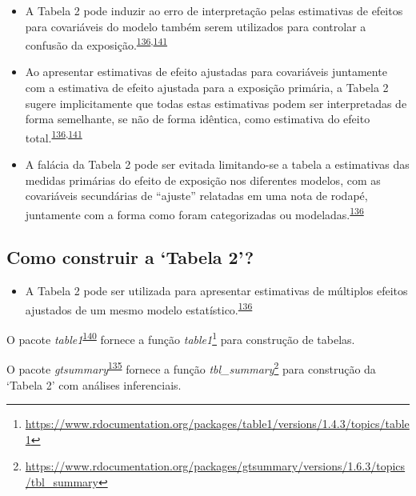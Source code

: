 \documentclass[
  a4paper,
]{book}
\providecommand{\tightlist}{%
  \setlength{\itemsep}{0pt}\setlength{\parskip}{0pt}}
\renewcommand{\href}[2]{#2\footnote{\url{#1}}}
\newenvironment{infobox}[1]
  {
  \begin{itemize}
  \renewcommand{\labelitemi}{
    \raisebox{-.7\height}[0pt][0pt]{
      {\setkeys{Gin}{width=3em,keepaspectratio}
        \texttt{[image: \#1]}}
    }
  }
  \setlength{\fboxsep}{1em}
  \begin{blackbox}
  \item
  }
  {
  \end{blackbox}
  \end{itemize}
  }
\begin{document}
\begin{itemize}
\item
  A Tabela 2 pode induzir ao erro de interpretação pelas estimativas de efeitos para covariáveis do modelo também serem utilizados para controlar a confusão da exposição.\textsuperscript{\protect\hyperlink{ref-Westreich2013}{136},\protect\hyperlink{ref-bandoli2018}{141}}
\item
  Ao apresentar estimativas de efeito ajustadas para covariáveis juntamente com a estimativa de efeito ajustada para a exposição primária, a Tabela 2 sugere implicitamente que todas estas estimativas podem ser interpretadas de forma semelhante, se não de forma idêntica, como estimativa do efeito total.\textsuperscript{\protect\hyperlink{ref-Westreich2013}{136},\protect\hyperlink{ref-bandoli2018}{141}}
\item
  A falácia da Tabela 2 pode ser evitada limitando-se a tabela a estimativas das medidas primárias do efeito de exposição nos diferentes modelos, com as covariáveis secundárias de ``ajuste'' relatadas em uma nota de rodapé, juntamente com a forma como foram categorizadas ou modeladas.\textsuperscript{\protect\hyperlink{ref-Westreich2013}{136}}
\end{itemize}

\hypertarget{como-construir-a-tabela-2}{%
\subsection{Como construir a `Tabela 2'?}\label{como-construir-a-tabela-2}}

\begin{itemize}
\tightlist
\item
  A Tabela 2 pode ser utilizada para apresentar estimativas de múltiplos efeitos ajustados de um mesmo modelo estatístico.\textsuperscript{\protect\hyperlink{ref-Westreich2013}{136}}
\end{itemize}

\begin{infobox}{images/Rlogo}
O pacote \emph{table1}\textsuperscript{\protect\hyperlink{ref-table1}{140}} fornece a função \href{https://www.rdocumentation.org/packages/table1/versions/1.4.3/topics/table1}{\emph{table1}} para construção de tabelas.

\end{infobox}

\begin{infobox}{images/Rlogo}
O pacote \emph{gtsummary}\textsuperscript{\protect\hyperlink{ref-gtsummary-2}{135}} fornece a função \href{https://www.rdocumentation.org/packages/gtsummary/versions/1.6.3/topics/tbl_summary}{\emph{tbl\_summary}} para construção da `Tabela 2' com análises inferenciais.

\end{infobox}
\end{document}

